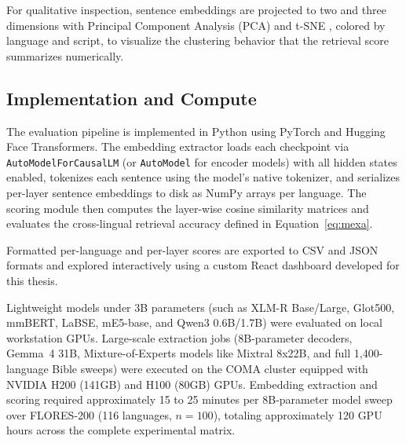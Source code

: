 For qualitative inspection, sentence embeddings are projected to two and three dimensions with Principal Component Analysis (PCA) and t-SNE \citep{van2008visualizing}, colored by language and script, to visualize the clustering behavior that the retrieval score summarizes numerically.

\subsection{Implementation and Compute}
\label{subsec:implementation}

The evaluation pipeline is implemented in Python using PyTorch and Hugging Face Transformers. The embedding extractor loads each checkpoint via \texttt{AutoModelForCausalLM} (or \texttt{AutoModel} for encoder models) with all hidden states enabled, tokenizes each sentence using the model's native tokenizer, and serializes per-layer sentence embeddings to disk as NumPy arrays per language. The scoring module then computes the layer-wise cosine similarity matrices and evaluates the cross-lingual retrieval accuracy defined in Equation~\eqref{eq:mexa}.

Formatted per-language and per-layer scores are exported to CSV and JSON formats and explored interactively using a custom React dashboard developed for this thesis.

Lightweight models under 3B parameters (such as XLM-R Base/Large, Glot500, mmBERT, LaBSE, mE5-base, and Qwen3 0.6B/1.7B) were evaluated on local workstation GPUs. Large-scale extraction jobs (8B-parameter decoders, Gemma~4 31B, Mixture-of-Experts models like Mixtral 8x22B, and full 1,400-language Bible sweeps) were executed on the COMA cluster equipped with NVIDIA H200 (141GB) and H100 (80GB) GPUs. Embedding extraction and scoring required approximately 15 to 25 minutes per 8B-parameter model sweep over FLORES-200 (116 languages, $n=100$), totaling approximately 120 GPU hours across the complete experimental matrix.
